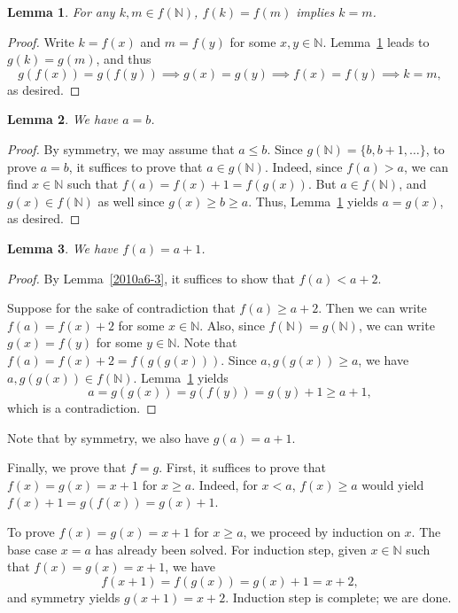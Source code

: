 \documentclass{article}
\newcommand{\N}{\mathbb{N}}
\newtheorem{lemma}{Lemma}
\begin{document}
\begin{lemma}\label{2010a6-4}
For any $k, m \in f(\N)$, $f(k) = f(m)$ implies $k = m$.
\end{lemma}
\begin{proof}
Write $k = f(x)$ and $m = f(y)$ for some $x, y \in \N$.
Lemma~\ref{2010a6-4} leads to $g(k) = g(m)$, and thus
\[ g(f(x)) = g(f(y)) \implies g(x) = g(y) \implies f(x) = f(y) \implies k = m, \]
    as desired.
\end{proof}

\begin{lemma}\label{2010a6-5}
We have $a = b$.
\end{lemma}
\begin{proof}
By symmetry, we may assume that $a \leq b$.
Since $g(\N) = \{b, b + 1, \ldots\}$, to prove $a = b$, it suffices to prove that $a \in g(\N)$.
Indeed, since $f(a) > a$, we can find $x \in \N$ such that $f(a) = f(x) + 1 = f(g(x))$.
But $a \in f(\N)$, and $g(x) \in f(\N)$ as well since $g(x) \geq b \geq a$.
Thus, Lemma~\ref{2010a6-4} yields $a = g(x)$, as desired.
\end{proof}

\begin{lemma}\label{2010a6-6}
We have $f(a) = a + 1$.
\end{lemma}
\begin{proof}
By Lemma~\ref{2010a6-3}, it suffices to show that $f(a) < a + 2$.

Suppose for the sake of contradiction that $f(a) \geq a + 2$.
Then we can write $f(a) = f(x) + 2$ for some $x \in \N$.
Also, since $f(\N) = g(\N)$, we can write $g(x) = f(y)$ for some $y \in \N$.
Note that $f(a) = f(x) + 2 = f(g(g(x)))$.
Since $a, g(g(x)) \geq a$, we have $a, g(g(x)) \in f(\N)$.
Lemma~\ref{2010a6-4} yields
\[ a = g(g(x)) = g(f(y)) = g(y) + 1 \geq a + 1, \]
    which is a contradiction.
\end{proof}

Note that by symmetry, we also have $g(a) = a + 1$.

Finally, we prove that $f = g$.
First, it suffices to prove that $f(x) = g(x) = x + 1$ for $x \geq a$.
Indeed, for $x < a$, $f(x) \geq a$ would yield $f(x) + 1 = g(f(x)) = g(x) + 1$.

To prove $f(x) = g(x) = x + 1$ for $x \geq a$, we proceed by induction on $x$.
The base case $x = a$ has already been solved.
For induction step, given $x \in \N$ such that $f(x) = g(x) = x + 1$, we have
\[ f(x + 1) = f(g(x)) = g(x) + 1 = x + 2, \]
    and symmetry yields $g(x + 1) = x + 2$.
Induction step is complete; we are done.
\end{document}
